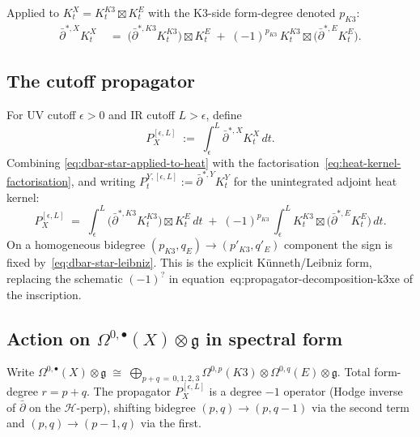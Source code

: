 \documentclass[11pt]{amsart}
\providecommand{\dbar}{\bar\partial}
\providecommand{\frakg}{\mathfrak{g}}
\theoremstyle{definition}
\theoremstyle{remark}
\begin{document}
Applied to $K^X_t = K^{K3}_t \boxtimes K^E_t$ with the K3-side
form-degree denoted $p_{K3}$:
\begin{align}
  \label{eq:dbar-star-applied-to-heat}
  \dbar^{*,X} K^X_t
  &\;=\; \bigl(\dbar^{*,K3} K^{K3}_t\bigr) \boxtimes K^E_t
   \;+\; (-1)^{p_{K3}}\, K^{K3}_t \boxtimes \bigl(\dbar^{*,E} K^E_t\bigr).
\end{align}

\subsection{The cutoff propagator}

For UV cutoff $\epsilon > 0$ and IR cutoff $L > \epsilon$, define
\begin{equation}
  \label{eq:cutoff-propagator-master}
  P_X^{[\epsilon,L]}
  \;:=\;
  \int_\epsilon^L \dbar^{*,X} K^X_t \, dt.
\end{equation}
Combining \eqref{eq:dbar-star-applied-to-heat} with the
factorisation~\eqref{eq:heat-kernel-factorisation}, and writing
$P^{Y,[\epsilon,L]}_t := \dbar^{*,Y} K^Y_t$ for the unintegrated
adjoint heat kernel:
\begin{equation}
  \label{eq:propagator-decomposition-explicit}
  \boxed{\;
  P_X^{[\epsilon,L]}
  \;=\;
  \int_\epsilon^L \bigl(\dbar^{*,K3} K^{K3}_t\bigr) \boxtimes K^E_t\,dt
  \;+\;
  (-1)^{p_{K3}}\,
  \int_\epsilon^L K^{K3}_t \boxtimes \bigl(\dbar^{*,E} K^E_t\bigr)\,dt.
  \;}
\end{equation}
On a homogeneous bidegree $(p_{K3}, q_E) \to (p'_{K3}, q'_E)$
component the sign is fixed by~\eqref{eq:dbar-star-leibniz}.
This is the explicit K\"unneth/Leibniz form, replacing the
schematic $(-1)^?$ in equation~\textsf{eq:propagator-decomposition-k3xe}
of the inscription.

\subsection{Action on $\Omega^{0,\bullet}(X) \otimes \frakg$ in spectral form}

Write
$\Omega^{0,\bullet}(X) \otimes \frakg \;\cong\;
\bigoplus_{p+q\,=\,0,1,2,3} \Omega^{0,p}(K3) \otimes \Omega^{0,q}(E) \otimes \frakg$.
Total form-degree $r = p + q$. The propagator
$P_X^{[\epsilon,L]}$ is a degree $-1$ operator (Hodge inverse of
$\dbar$ on the $\mathcal H$-perp), shifting bidegree
$(p,q) \to (p,q-1)$ via the second term and $(p,q) \to (p-1,q)$
via the first.
\end{document}
